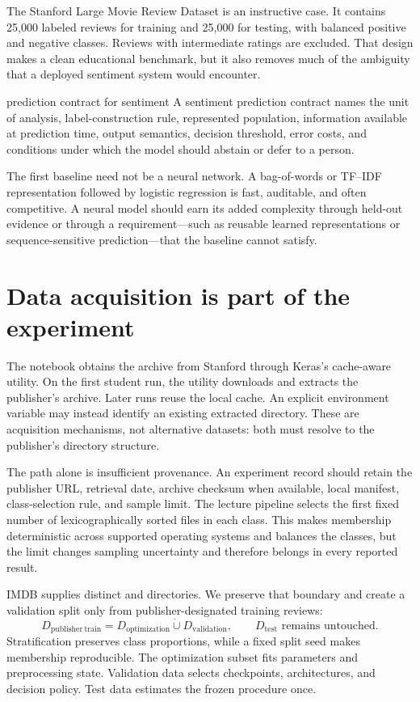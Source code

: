 The Stanford Large Movie Review Dataset is an instructive case. It contains
25,000 labeled reviews for training and 25,000 for testing, with balanced
positive and negative classes. Reviews with intermediate ratings are excluded.
That design makes a clean educational benchmark, but it also removes much of
the ambiguity that a deployed sentiment system would encounter.

\begin{definitionbox}{prediction contract for sentiment}
A sentiment prediction contract names the unit of analysis, label-construction
rule, represented population, information available at prediction time,
output semantics, decision threshold, error costs, and conditions under which
the model should abstain or defer to a person.
\end{definitionbox}

The first baseline need not be a neural network. A bag-of-words or TF--IDF
representation followed by logistic regression is fast, auditable, and often
competitive. A neural model should earn its added complexity through held-out
evidence or through a requirement---such as reusable learned representations
or sequence-sensitive prediction---that the baseline cannot satisfy.

\section{Data acquisition is part of the experiment}

The notebook obtains the archive from Stanford through Keras's cache-aware
 utility. On the first student run, the utility downloads and
extracts the publisher's archive. Later runs reuse the local cache. An explicit
environment variable may instead identify an existing extracted
 directory. These are acquisition mechanisms, not alternative
datasets: both must resolve to the publisher's directory structure.

The path alone is insufficient provenance. An experiment record should retain
the publisher URL, retrieval date, archive checksum when available, local
manifest, class-selection rule, and sample limit. The lecture pipeline selects
the first fixed number of lexicographically sorted files in each class. This
makes membership deterministic across supported operating systems and balances
the classes, but the limit changes sampling uncertainty and therefore belongs
in every reported result.

IMDB supplies distinct  and  directories. We preserve
that boundary and create a validation split only from publisher-designated
training reviews:
\[
  D_{\mathrm{publisher\ train}}
  =D_{\mathrm{optimization}}\mathbin{\dot\cup}D_{\mathrm{validation}},
  \qquad
  D_{\mathrm{test}}\text{ remains untouched.}
\]
Stratification preserves class proportions, while a fixed split seed makes
membership reproducible. The optimization subset fits parameters and
preprocessing state. Validation data selects checkpoints, architectures, and
decision policy. Test data estimates the frozen procedure once.

